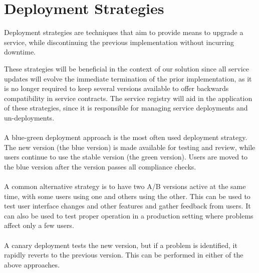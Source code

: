 \section{Deployment Strategies} %
\label{sec:deployment_strategies}

Deployment strategies are techniques that aim to provide means to upgrade a service,
while discontinuing the previous implementation without incurring downtime.

These strategies will be beneficial in the context of our solution since all service updates will evolve the immediate termination of the prior implementation,
as it is no longer required to keep several versions available to offer backwards compatibility in service contracts.
The service registry will aid in the application of these strategies, since it is responsible for managing service deployments and un-deployments.

\paragraph{}

A blue-green deployment approach is the most often used deployment strategy.
The new version (the blue version) is made available for testing and review, while users continue to use the stable version (the green version).
Users are moved to the blue version after the version passes all compliance checks.

\paragraph{}

A common alternative strategy is to have two A/B versions active at the same time, with some users using one and others using the other.
This can be used to test user interface changes and other features and gather feedback from users.
It can also be used to test proper operation in a production setting where problems affect only a few users.

\paragraph{}

A canary deployment tests the new version, but if a problem is identified, it rapidly reverts to the previous version.
This can be performed in either of the above approaches.

\paragraph{}


